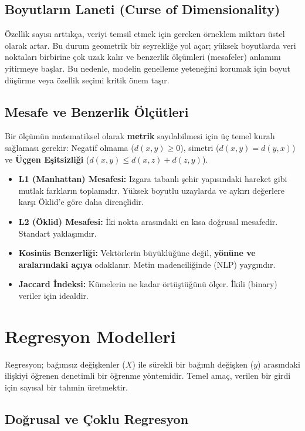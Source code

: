 \documentclass[12pt,a4paper]{article}
\begin{document}
\subsection{Boyutların Laneti (Curse of Dimensionality)}
Özellik sayısı arttıkça, veriyi temsil etmek için gereken örneklem miktarı üstel olarak artar. Bu durum geometrik bir seyrekliğe yol açar; yüksek boyutlarda veri noktaları birbirine çok uzak kalır ve benzerlik ölçümleri (mesafeler) anlamını yitirmeye başlar. Bu nedenle, modelin genelleme yeteneğini korumak için boyut düşürme veya özellik seçimi kritik önem taşır.

\subsection{Mesafe ve Benzerlik Ölçütleri}
Bir ölçümün matematiksel olarak \textbf{metrik} sayılabilmesi için üç temel kuralı sağlaması gerekir: Negatif olmama ($d(x,y) \geq 0$), simetri ($d(x,y)=d(y,x)$) ve \textbf{Üçgen Eşitsizliği} ($d(x,y) \leq d(x,z) + d(z,y)$).

\begin{itemize}
    \item \textbf{L1 (Manhattan) Mesafesi:} Izgara tabanlı şehir yapısındaki hareket gibi mutlak farkların toplamıdır. Yüksek boyutlu uzaylarda ve aykırı değerlere karşı Öklid'e göre daha dirençlidir.
    \item \textbf{L2 (Öklid) Mesafesi:} İki nokta arasındaki en kısa doğrusal mesafedir. Standart yaklaşımdır.
    \item \textbf{Kosinüs Benzerliği:} Vektörlerin büyüklüğüne değil, \textbf{yönüne ve aralarındaki açıya} odaklanır. Metin madenciliğinde (NLP) yaygındır.
    \item \textbf{Jaccard İndeksi:} Kümelerin ne kadar örtüştüğünü ölçer. İkili (binary) veriler için idealdir.
\end{itemize}



\newpage
\section{Regresyon Modelleri}
Regresyon; bağımsız değişkenler ($X$) ile sürekli bir bağımlı değişken ($y$) arasındaki ilişkiyi öğrenen denetimli bir öğrenme yöntemidir. Temel amaç, verilen bir girdi için sayısal bir tahmin üretmektir.

\subsection{Doğrusal ve Çoklu Regresyon}
\end{document}
